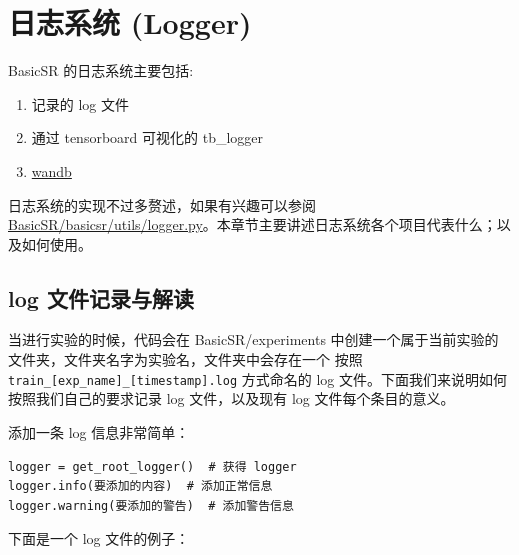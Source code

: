 \documentclass[../main.tex]{subfiles}
\begin{document}
\section{日志系统 (Logger)}\label{code_structure:logger}

BasicSR 的日志系统主要包括:

\begin{enumerate}
    \item 记录的 log 文件
    \item 通过 tensorboard 可视化的 tb\_logger
    \item \href{https://wandb.ai/}{wandb}
\end{enumerate}

日志系统的实现不过多赘述，如果有兴趣可以参阅 \href{https://github.com/XPixelGroup/BasicSR/blob/master/basicsr/utils/logger.py}{BasicSR/basicsr/utils/logger.py}。本章节主要讲述日志系统各个项目代表什么；以及如何使用。

\subsection{log 文件记录与解读}\label{code_structure:log_record}

当进行实验的时候，代码会在 BasicSR/experiments 中创建一个属于当前实验的文件夹，文件夹名字为实验名，文件夹中会存在一个 按照 \texttt{train\_[exp\_name]\_[timestamp].log} 方式命名的 log 文件。下面我们来说明如何按照我们自己的要求记录 log 文件，以及现有 log 文件每个条目的意义。

\begin{hl} %

    添加一条 log 信息非常简单：

    \begin{verbatim}
logger = get_root_logger()  # 获得 logger
logger.info(要添加的内容)  # 添加正常信息
logger.warning(要添加的警告)  # 添加警告信息
    \end{verbatim}
\end{hl}

下面是一个 log 文件的例子：
\end{document}
